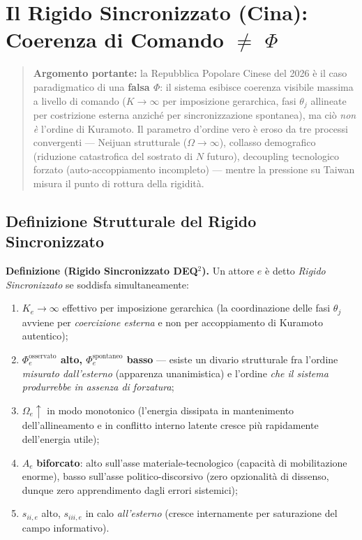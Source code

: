 \chapter{\texorpdfstring{Il Rigido Sincronizzato (Cina): Coerenza di
Comando $\neq$
\(\Phi\)}{Il Rigido Sincronizzato (Cina): Coerenza di Comando $\neq$ \textbackslash Phi}}\label{il-rigido-sincronizzato-cina-coerenza-di-comando-phi}

\begin{quote}
\textbf{Argomento portante:} la Repubblica Popolare Cinese del 2026 è il
caso paradigmatico di una \textbf{falsa \(\Phi\)}: il sistema esibisce
coerenza visibile massima a livello di comando (\(K \to \infty\) per
imposizione gerarchica, fasi \(\theta_j\) allineate per costrizione
esterna anziché per sincronizzazione spontanea), ma ciò \emph{non è}
l'ordine di Kuramoto. Il parametro d'ordine vero è eroso da tre processi
convergenti --- Neijuan strutturale (\(\Omega \to \infty\)), collasso
demografico (riduzione catastrofica del sostrato di \(N\) futuro),
decoupling tecnologico forzato (auto-accoppiamento incompleto) ---
mentre la pressione su Taiwan misura il punto di rottura della rigidità.
\end{quote}



\section{Definizione Strutturale del Rigido
Sincronizzato}\label{definizione-strutturale-del-rigido-sincronizzato}

\Hypoth{} \textbf{Definizione (Rigido Sincronizzato DEQ$^2$).} Un attore
\(e\) è detto \emph{Rigido Sincronizzato} se soddisfa simultaneamente:

\begin{enumerate}
\def\labelenumi{\arabic{enumi}.}
\tightlist
\item
  \(K_e \to \infty\) effettivo per imposizione gerarchica (la
  coordinazione delle fasi \(\theta_j\) avviene per \emph{coercizione
  esterna} e non per accoppiamento di Kuramoto autentico);
\item
  \textbf{\(\Phi_e^{\text{osservato}}\) alto,
  \(\Phi_e^{\text{spontaneo}}\) basso} --- esiste un divario strutturale
  fra l'ordine \emph{misurato dall'esterno} (apparenza unanimistica) e
  l'ordine \emph{che il sistema produrrebbe in assenza di forzatura};
\item
  \(\Omega_e \uparrow\) in modo monotonico (l'energia dissipata in
  mantenimento dell'allineamento e in conflitto interno latente cresce
  più rapidamente dell'energia utile);
\item
  \(A_e\) \textbf{biforcato}: alto sull'asse materiale-tecnologico
  (capacità di mobilitazione enorme), basso sull'asse
  politico-discorsivo (zero opzionalità di dissenso, dunque zero
  apprendimento dagli errori sistemici);
\item
  \(s_{ii,e}\) alto, \(s_{iii,e}\) in calo \emph{all'esterno} (cresce
  internamente per saturazione del campo informativo).
\end{enumerate}

